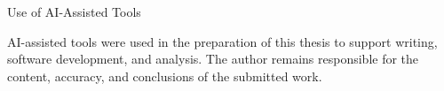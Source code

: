 \documentclass[a4paper, 12pt, oneside, BCOR1cm,toc=chapterentrywithdots]{scrbook}
\begin{document}
\begin{center}
{\Large\normalfont Use of AI-Assisted Tools\par}
\vspace{1.5em}
\begin{minipage}{0.78\textwidth}
\setlength{\parindent}{0pt}
\setlength{\parskip}{0.9\baselineskip}
\itshape

AI-assisted tools were used in the preparation of this thesis to
support writing, software development, and analysis. The author
remains responsible for the content, accuracy, and conclusions of
the submitted work.

\end{minipage}
\end{center}
\vfill
\clearpage




\printindex
\end{document}
